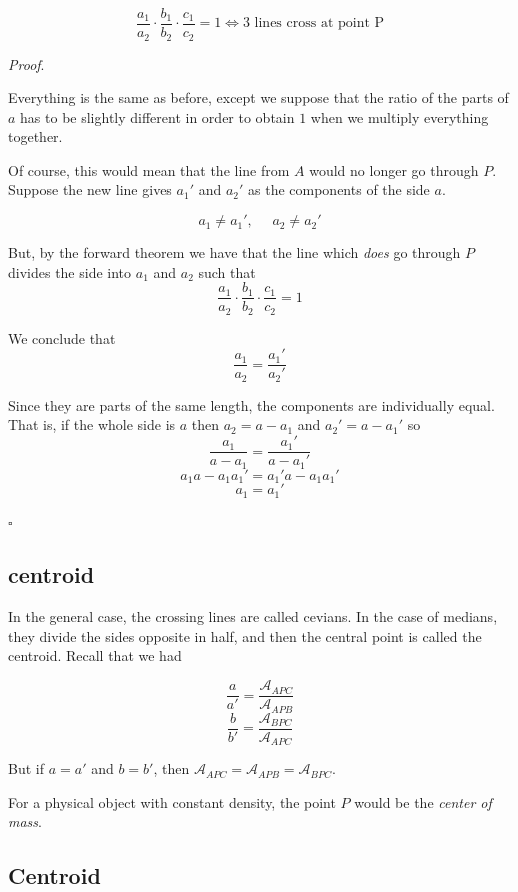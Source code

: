 \documentclass[11pt, oneside]{article}
\begin{document}
\[ \frac{a_1}{a_2} \cdot \frac{b_1}{b_2} \cdot  \frac{c_1}{c_2}  = 1 \iff \text{3 lines cross at point P} \]

\emph{Proof}.

Everything is the same as before, except we suppose that the ratio of the parts of $a$ has to be slightly different in order to obtain $1$ when we multiply everything together.

Of course, this would mean that the line from $A$ would no longer go through $P$.  Suppose the new line gives $a_1'$ and $a_2'$ as the components of the side $a$.

\[ a_1 \ne a_1', \ \ \ \ \ \  a_2 \ne a_2' \]

But, by the forward theorem we have that the line which \emph{does} go through $P$ divides the side into $a_1$ and $a_2$ such that
\[ \frac{a_1}{a_2} \cdot \frac{b_1}{b_2} \cdot  \frac{c_1}{c_2}  = 1 \]

We conclude that
\[ \frac{a_1}{a_2} = \frac{a_1'}{a_2'} \]

Since they are parts of the same length, the components are individually equal.  That is, if the whole side is $a$ then $a_2 = a - a_1$ and $a_2' = a - a_1'$ so
\[ \frac{a_1}{a - a_1} = \frac{a_1'}{a - a_1'} \]
\[ a_1 a - a_1 a_1' = a_1' a - a_1 a_1' \]
\[ a_1 = a_1' \]

$\square$

\subsection*{centroid}

In the general case, the crossing lines are called cevians.  In the case of medians, they divide the sides opposite in half, and then the central point is called the centroid.  Recall that we had

\[ \frac{a}{a'} = \frac{\mathcal{A}_{APC}}{\mathcal{A}_{APB}} \]
\[ \frac{b}{b'} = \frac{\mathcal{A}_{BPC}}{\mathcal{A}_{APC}} \]

But if $a = a'$ and $b = b'$, then $\mathcal{A}_{APC} = \mathcal{A}_{APB} = \mathcal{A}_{BPC}$.  

For a physical object with constant density, the point $P$ would be the \emph{center of mass}.

\subsection*{Centroid}

\label{sec:centroid_one_third}
\end{document}
